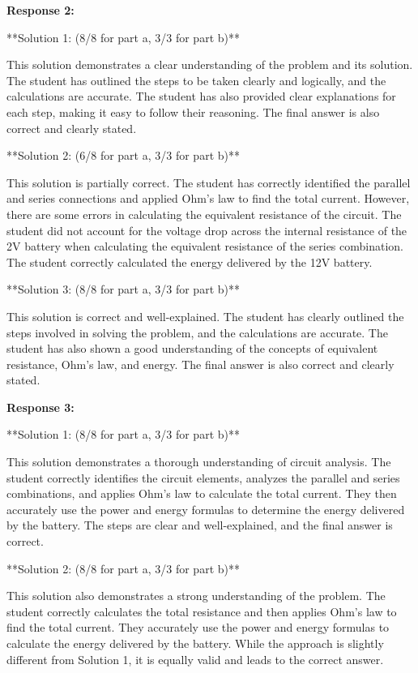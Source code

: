\documentclass[a4paper,11pt]{article}
\begin{document}
\bigskip    
\textbf{Response 2:}

**Solution 1: (8/8 for part a, 3/3 for part b)**

This solution demonstrates a clear understanding of the problem and its solution. The student has outlined the steps to be taken clearly and logically, and the calculations are accurate. The student has also provided clear explanations for each step, making it easy to follow their reasoning. The final answer is also correct and clearly stated.

**Solution 2: (6/8 for part a, 3/3 for part b)**

This solution is partially correct. The student has correctly identified the parallel and series connections and applied Ohm's law to find the total current. However, there are some errors in calculating the equivalent resistance of the circuit. The student did not account for the voltage drop across the internal resistance of the 2V battery when calculating the equivalent resistance of the series combination. The student correctly calculated the energy delivered by the 12V battery.

**Solution 3: (8/8 for part a, 3/3 for part b)**

This solution is correct and well-explained. The student has clearly outlined the steps involved in solving the problem, and the calculations are accurate. The student has also shown a good understanding of the concepts of equivalent resistance, Ohm's law, and energy. The final answer is also correct and clearly stated.

\bigskip    
\textbf{Response 3:}

**Solution 1: (8/8 for part a, 3/3 for part b)**

This solution demonstrates a thorough understanding of circuit analysis. The student correctly identifies the circuit elements, analyzes the parallel and series combinations, and applies Ohm's law to calculate the total current. They then accurately use the power and energy formulas to determine the energy delivered by the battery. The steps are clear and well-explained, and the final answer is correct.

**Solution 2: (8/8 for part a, 3/3 for part b)**

This solution also demonstrates a strong understanding of the problem. The student correctly calculates the total resistance and then applies Ohm's law to find the total current. They accurately use the power and energy formulas to calculate the energy delivered by the battery. While the approach is slightly different from Solution 1, it is equally valid and leads to the correct answer.
\end{document}
